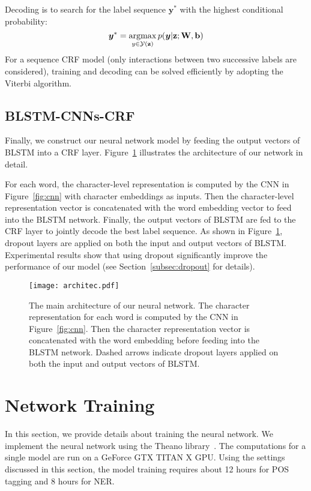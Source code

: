 \documentclass[11pt]{article}
\newcommand{\argmax}{\operatornamewithlimits{argmax}}
\begin{document}
Decoding is to search for the label sequence $\boldsymbol{y}^*$ with the highest conditional probability:
\begin{displaymath}
\boldsymbol{y}^* = \argmax\limits_{y \in \mathcal{Y}(\mathbf{z})} p(\boldsymbol{y}|\mathbf{z};\mathbf{W}, \mathbf{b})
\end{displaymath}
For a sequence CRF model (only interactions between two successive labels are considered), training and decoding can be solved efficiently by adopting the Viterbi algorithm.

\subsection{BLSTM-CNNs-CRF}
Finally, we construct our neural network model by feeding the output vectors of BLSTM into a CRF layer. Figure~\ref{fig:architec} illustrates the architecture of our network in detail.

For each word, the character-level representation is computed by the CNN in Figure~\ref{fig:cnn} with character embeddings as inputs. Then the character-level representation vector is concatenated with the word embedding vector to feed into the BLSTM network. Finally, the output vectors of BLSTM are fed to the CRF layer to jointly decode the best label sequence. As shown in Figure~\ref{fig:architec}, dropout layers are applied on both the input and output vectors of BLSTM. Experimental results show that using dropout significantly improve the performance of our model (see Section~\ref{subsec:dropout} for details).

\begin{figure}[t]
\centering
\texttt{[image: architec.pdf]}
\caption{The main architecture of our neural network. The character representation for each word is computed by the CNN in Figure~\ref{fig:cnn}. Then the character representation vector is concatenated with the word embedding before feeding into the BLSTM network. Dashed arrows indicate dropout layers applied on both the input and output vectors of BLSTM.}
\label{fig:architec}
\end{figure}

\section{Network Training}
In this section, we provide details about training the neural network. We implement the neural network using the Theano library~\cite{bergstra2010theano}. The computations for a single model are run on a GeForce GTX TITAN X GPU. Using the settings discussed in this section, the model training requires about 12 hours for POS tagging and 8 hours for NER.
\end{document}
